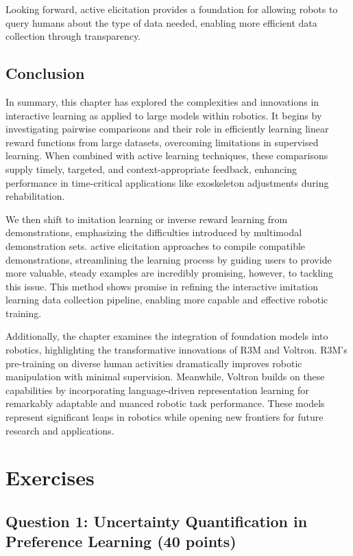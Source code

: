 \documentclass[
  letterpaper,
  numbers=noenddot,
  DIV=11]{scrreprt}
\theoremstyle{definition}
\theoremstyle{plain}
\theoremstyle{plain}
\theoremstyle{remark}
\begin{document}
Looking forward, active elicitation provides a foundation for allowing
robots to query humans about the type of data needed, enabling more
efficient data collection through transparency.

\subsection{Conclusion}\label{conclusion-1}

In summary, this chapter has explored the complexities and innovations
in interactive learning as applied to large models within robotics. It
begins by investigating pairwise comparisons and their role in
efficiently learning linear reward functions from large datasets,
overcoming limitations in supervised learning. When combined with active
learning techniques, these comparisons supply timely, targeted, and
context-appropriate feedback, enhancing performance in time-critical
applications like exoskeleton adjustments during rehabilitation.

We then shift to imitation learning or inverse reward learning from
demonstrations, emphasizing the difficulties introduced by multimodal
demonstration sets. active elicitation approaches to compile compatible
demonstrations, streamlining the learning process by guiding users to
provide more valuable, steady examples are incredibly promising,
however, to tackling this issue. This method shows promise in refining
the interactive imitation learning data collection pipeline, enabling
more capable and effective robotic training.

Additionally, the chapter examines the integration of foundation models
into robotics, highlighting the transformative innovations of R3M and
Voltron. R3M's pre-training on diverse human activities dramatically
improves robotic manipulation with minimal supervision. Meanwhile,
Voltron builds on these capabilities by incorporating language-driven
representation learning for remarkably adaptable and nuanced robotic
task performance. These models represent significant leaps in robotics
while opening new frontiers for future research and applications.

\section{Exercises}\label{exercises-1}

\subsection*{Question 1: Uncertainty Quantification in Preference
Learning (40
points)}\label{sec-question-1-uncertainty-quantification-in-preference-learning-40-points}
\end{document}
